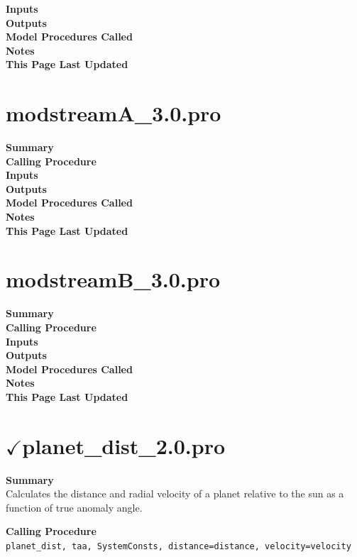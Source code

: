 \documentclass[11pt]{article}
\newcommand\descrip[1]{\textsf{\textbf{\large{#1}}}\\}
\begin{document}
\descrip{Inputs}

\descrip{Outputs}

\descrip{Model Procedures Called}

\descrip{Notes}

\descrip{This Page Last Updated}

\clearpage

\section{modstreamA\_3.0.pro} \label{sec:modstreamA}

\descrip{Summary}

\descrip{Calling Procedure}

\descrip{Inputs}

\descrip{Outputs}

\descrip{Model Procedures Called}

\descrip{Notes}

\descrip{This Page Last Updated}

\clearpage

\section{modstreamB\_3.0.pro} \label{sec:modstreamB}

\descrip{Summary}

\descrip{Calling Procedure}

\descrip{Inputs}

\descrip{Outputs}

\descrip{Model Procedures Called}

\descrip{Notes}

\descrip{This Page Last Updated}

\clearpage

\section{$\checkmark$planet\_dist\_2.0.pro} \label{sec:planet_dist}

\descrip{Summary}
Calculates the distance and radial velocity of a planet relative to the sun as
a function of true anomaly angle.

\descrip{Calling Procedure}
\verb+planet_dist, taa, SystemConsts, distance=distance, velocity=velocity+
\end{document}
